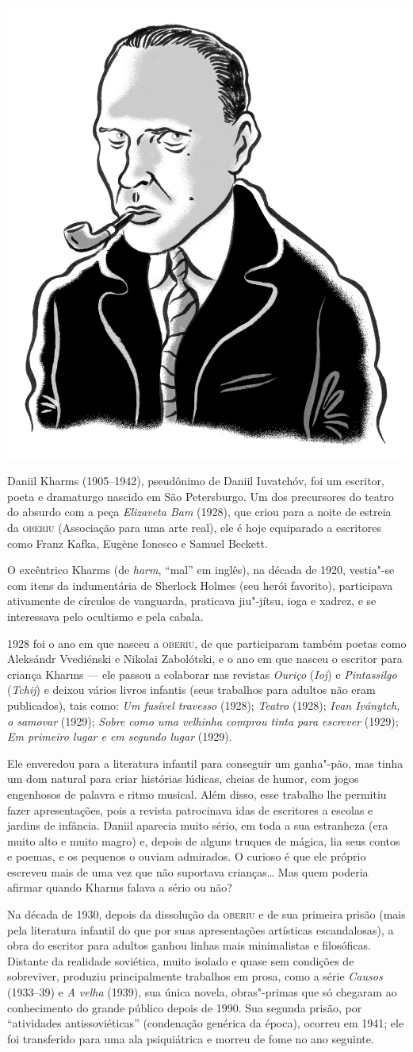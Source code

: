 \noindent\includegraphics[width=.8in]{./imgs/autor12.jpg}

\noindent{}Daniil Kharms (1905--1942), pseudônimo de Daniil Iuvatchóv, foi um
escritor, poeta e dramaturgo nascido em São Petersburgo. Um dos
precursores do teatro do absurdo com a peça \emph{Elizaveta Bam} (1928),
que criou para a noite de estreia da \textsc{oberiu} (Associação para uma arte
real), ele é hoje equiparado a escritores como Franz Kafka, Eugène
Ionesco e Samuel Beckett.

O excêntrico Kharms (de \emph{harm}, ``mal'' em inglês), na década de
1920, vestia"-se com itens da indumentária de Sherlock Holmes (seu herói
favorito), participava ativamente de círculos de vanguarda, praticava
jiu"-jítsu, ioga e xadrez, e se interessava pelo ocultismo e pela cabala.

1928 foi o ano em que nasceu a \textsc{oberiu}, de que participaram também poetas
como Aleksándr Vvediénski e Nikolai Zabolótski, e o ano em que nasceu o
escritor para criança Kharms --- ele passou a colaborar nas revistas
\emph{Ouriço} (\emph{Ioj}) e \emph{Pintassilgo} (\emph{Tchij}) e deixou
vários livros infantis (seus trabalhos para adultos não eram
publicados), tais como: \emph{Um fusível travesso} (1928); \emph{Teatro}
(1928); \emph{Ivan Iványtch, o samovar} (1929); \emph{Sobre como uma
velhinha comprou tinta para escrever} (1929); \emph{Em primeiro lugar e
em segundo lugar} (1929).

Ele enveredou para a literatura infantil para conseguir um ganha"-pão,
mas tinha um dom natural para criar histórias lúdicas, cheias de humor,
com jogos engenhosos de palavra e ritmo musical. Além disso, esse
trabalho lhe permitiu fazer apresentações, pois a revista patrocinava
idas de escritores a escolas e jardins de infância. Daniil aparecia
muito sério, em toda a sua estranheza (era muito alto e muito magro) e,
depois de alguns truques de mágica, lia seus contos e poemas, e os
pequenos o ouviam admirados. O curioso é que ele próprio escreveu mais
de uma vez que não suportava crianças\ldots{} Mas quem poderia afirmar quando
Kharms falava a sério ou não?

Na década de 1930, depois da dissolução da \textsc{oberiu} e de sua primeira
prisão (mais pela literatura infantil do que por suas apresentações
artísticas escandalosas), a obra do escritor para adultos ganhou linhas
mais minimalistas e filosóficas. Distante da realidade soviética, muito
isolado e quase sem condições de sobreviver, produziu principalmente
trabalhos em prosa, como a série \emph{Causos} (1933--39) e \emph{A
velha} (1939), sua única novela, obras"-primas que só chegaram ao
conhecimento do grande público depois de 1990. Sua segunda prisão, por
``atividades antissoviéticas'' (condenação genérica da época), ocorreu
em 1941; ele foi transferido para uma ala psiquiátrica e morreu de fome
no ano seguinte.

